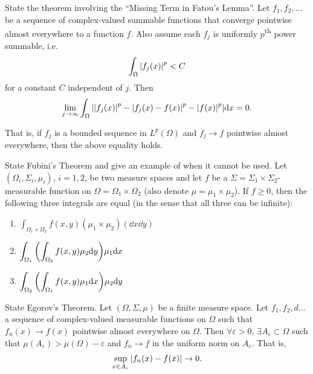 \documentclass[avery5388,grid,frame]{flashcards}
\newcommand{\E}{\varepsilon}
\begin{document}
\begin{flashcard}
    {State the theorem involving the ``Missing Term in Fatou's Lemma''.}
    Let $f_1,f_2,\dots$ be a sequence of complex-valued summable functions that converge pointwise almost everywhere to a function $f$.  Also assume each $f_j$ is uniformly $p$\textsuperscript{th} power summable, i.e.
    \begin{align*}
        \int_\Omega \abs{f_j(x)}^p < C
    \end{align*}
    for a constant $C$ independent of $j$.  Then
    \begin{align*}
        \lim_{j\rightarrow\infty} \int_\Omega \abs{\abs{f_j(x)}^p - \abs{f_j(x) - f(x)}^p - \abs{f(x)}^p}\dd x = 0.
    \end{align*}

    That is, if $f_j$ is a bounded sequence in $L^p(\Omega)$ and $f_j \rightarrow f$ pointwise almost everywhere, then the above equality holds.
\end{flashcard}

\begin{flashcard}
    {State Fubini's Theorem and give an example of when it cannot be used.}
    Let $(\Omega_i, \Sigma_i, \mu_i)$, $i = 1,2$, be two measure spaces and let $f$ be a $\Sigma = \Sigma_1\times\Sigma_2$-measurable function on $\Omega = \Omega_1\times\Omega_2$ (also denote $\mu = \mu_1 \times \mu_2$).  If $f \geq 0$, then the following three integrals are equal (in the sense that all three can be infinite):
    \begin{enumerate}[ 1) ]
        \item $\displaystyle \int_{\Omega_1\times\Omega_2} f(x,y)(\mu_1\times\mu_2)(\dd x\dd y)$
        \item $\displaystyle \int_{\Omega_1}\qty(\int_{\Omega_2}f(x,y) \mu_2\dd y) \mu_1\dd x$
        \item $\displaystyle \int_{\Omega_2}\qty(\int_{\Omega_1}f(x,y) \mu_1 \dd x) \mu_2 \dd y$
    \end{enumerate}
\end{flashcard}

\begin{flashcard}
    {State Egorov's Theorem.}
    Let $(\Omega, \Sigma, \mu)$ be a finite measure space.  Let $f_1,f_2,d\dots$ a sequence of complex-valued measurable functions on $\Omega$ such that $f_n(x) \rightarrow f(x)$ pointwise almost everywhere on $\Omega$.  Then $\forall\E > 0$, $\exists A_\E \subset \Omega$ such that $\mu(A_\E) > \mu(\Omega) - \E$ and $f_n \rightarrow f$ in the uniform norm on $A_\E$.  That is,
    \begin{align*}
        \sup_{x \in A_\E}\abs{f_n(x) - f(x)} \rightarrow 0.
    \end{align*}
\end{flashcard}
\end{document}
